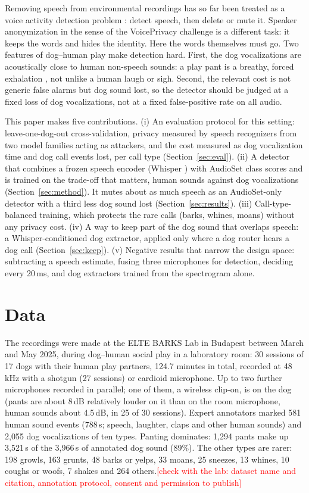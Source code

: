 \documentclass[10pt,twocolumn,a4paper]{article}
\newcommand{\todo}[1]{\textcolor{red}{[#1]}}
\begin{document}
Removing speech from environmental recordings has so far been treated as a voice activity detection
problem \cite{cretois2022,priebe2024}: detect speech, then delete or mute it. Speaker anonymization in
the sense of the VoicePrivacy challenge \cite{tomashenko2020voiceprivacy} is a different task: it keeps
the words and hides the identity. Here the words themselves must go. Two features of dog--human play
make detection hard. First, the dog vocalizations are acoustically close to human non-speech sounds:
a play pant is a breathy, forced exhalation \cite{simonet2005laughter}, not unlike a human laugh or sigh.
Second, the relevant cost is not generic false alarms but dog sound lost, so the detector should be
judged at a fixed loss of dog vocalizations, not at a fixed false-positive rate on all audio.

This paper makes five contributions. (i) An evaluation protocol for this setting: leave-one-dog-out
cross-validation, privacy measured by speech recognizers from two model families acting as attackers,
and the cost measured as dog vocalization time and dog call events lost, per call type
(Section~\ref{sec:eval}). (ii) A detector that combines a frozen speech encoder (Whisper
\cite{radford2023whisper}) with AudioSet class scores \cite{schmid2023efficientat} and is trained on
the trade-off that matters, human sounds against dog vocalizations (Section~\ref{sec:method}). It mutes
about as much speech as an AudioSet-only detector with a third less dog sound lost
(Section~\ref{sec:results}). (iii) Call-type-balanced training, which protects the rare calls (barks,
whines, moans) without any privacy cost. (iv) A way to keep part of the dog sound that overlaps speech:
a Whisper-conditioned dog extractor, applied only where a dog router hears a dog call
(Section~\ref{sec:keep}). (v) Negative results that narrow the design space: subtracting a speech
estimate, fusing three microphones for detection, deciding every 20\,ms, and dog extractors trained from
the spectrogram alone.

\section{Data}
\label{sec:data}
The recordings were made at the ELTE BARKS Lab in Budapest between March and May 2025, during
dog--human social play in a laboratory room: 30 sessions of 17 dogs with their human play partners,
124.7 minutes in total, recorded at 48\,kHz with a shotgun (27 sessions) or cardioid microphone.
Up to two further microphones recorded in parallel; one of them, a wireless clip-on, is on the dog
(pants are about 8\,dB relatively louder on it than on the room microphone, human sounds about 4.5\,dB, in
25 of 30 sessions). Expert annotators
marked 581 human sound events (788\,s; speech, laughter, claps and other human sounds) and 2{,}055 dog
vocalizations of ten types. Panting dominates: 1{,}294 pants make up 3{,}521\,s of the 3{,}966\,s of
annotated dog sound (89\%). The other types are rarer: 198 growls, 163 grunts, 48 barks or yelps,
33 moans, 25 sneezes, 13 whines, 10 coughs or woofs, 7 shakes and 264 others.\todo{check with the lab: dataset name and citation, annotation protocol, consent and permission to publish}
\end{document}

